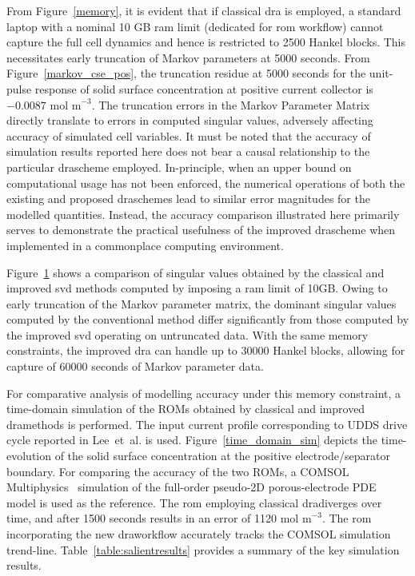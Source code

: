 From Figure~\ref{memory}, it is evident that if classical \gls{dra}
is employed, a standard laptop with a nominal 10 GB \gls{ram} limit (dedicated
for \gls{rom} workflow) cannot capture the full cell dynamics and hence
is restricted to 2500 Hankel blocks. This necessitates early truncation
of Markov parameters at 5000 seconds. From Figure~\ref{markov_cse_pos},
the truncation residue at 5000 seconds for the unit-pulse response
of solid surface concentration at positive current collector is $-0.0087 \text{ mol m}^{-\text{3}}$.
The truncation errors in the Markov Parameter Matrix directly translate
to errors in computed singular values, adversely affecting accuracy
of simulated cell variables. It must be noted that the accuracy of
simulation results reported here does not bear a causal relationship
to the particular \gls{dra}scheme employed. In-principle, when an upper
bound on computational usage has not been enforced, the numerical
operations of both the existing and proposed \gls{dra}schemes lead to similar
error magnitudes for the modelled quantities. Instead, the accuracy
comparison illustrated here primarily serves to demonstrate the practical
usefulness of the improved \gls{dra}scheme when implemented in a commonplace
computing environment.

\begin{figure}
	\caption{}
	\label{truncated}
\end{figure}

Figure~\ref{truncated} shows a comparison of singular values obtained
by the classical and improved \gls{svd} methods computed by imposing a \gls{ram}
limit of 10GB. Owing to early truncation of the Markov parameter matrix,
the dominant singular values computed by the conventional method differ
significantly from those computed by the improved \gls{svd} operating on
untruncated data. With the same memory constraints, the improved \gls{dra}
can handle up to 30000 Hankel blocks, allowing for capture of 60000
seconds of Markov parameter data.

For comparative analysis of modelling accuracy under this memory constraint,
a time-domain simulation of the ROMs obtained by classical and improved
\gls{dra}methods is performed. The input current profile corresponding
to UDDS drive cycle reported in Lee~et~al. \cite{LeeChemistruckPlett2012}
is used. Figure~\ref{time_domain_sim} depicts the time-evolution
of the solid surface concentration at the positive electrode/separator
boundary. For comparing the accuracy of the two ROMs, a COMSOL Multiphysics~\cite{Multiphysics2012}
simulation of the full-order pseudo-2D porous-electrode PDE model
is used as the reference. The \gls{rom} employing classical \gls{dra}diverges
over time, and after 1500 seconds results in an error of 1120$\text{ mol m}^{-\text{3}}$$.$
The \gls{rom} incorporating the new \gls{dra}workflow accurately tracks the COMSOL
simulation trend-line. Table~\ref{table:salientresults} provides
a summary of the key simulation results.

